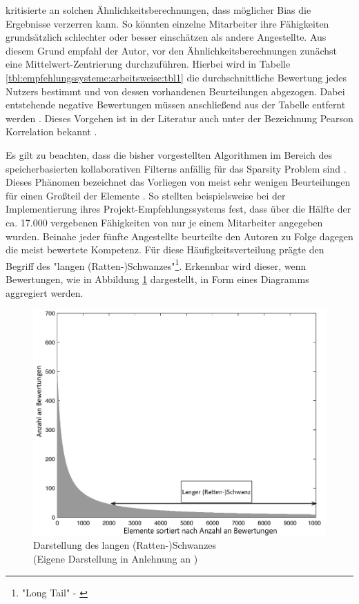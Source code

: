 \textcite[S. 34ff.]{recommenderSystems:2016} kritisierte an solchen Ähnlichkeitsberechnungen, dass möglicher Bias die Ergebnisse verzerren kann. So könnten einzelne Mitarbeiter ihre Fähigkeiten grundsätzlich schlechter oder besser einschätzen als andere Angestellte. Aus diesem Grund empfahl der Autor, vor den Ähnlichkeitsberechnungen zunächst eine Mittelwert-Zentrierung durchzuführen. Hierbei wird in Tabelle \ref{tbl:empfehlungssysteme:arbeitsweise:tbl1} die durchschnittliche Bewertung jedes Nutzers bestimmt und von dessen vorhandenen Beurteilungen abgezogen. Dabei entstehende negative Bewertungen müssen anschließend aus der Tabelle entfernt werden \cite[S. 34ff.]{recommenderSystems:2016}. Dieses Vorgehen ist in der Literatur auch unter der Bezeichnung Pearson Korrelation bekannt \cite[S. 35]{recommenderSystems:2016}\cite[S. 3]{bharti:2019}.

Es gilt zu beachten, dass die bisher vorgestellten Algorithmen im Bereich des speicherbasierten kollaborativen Filterns anfällig für das Sparsity Problem sind \cite[S. 3f.]{grvcar:2006}. Dieses Phänomen bezeichnet das Vorliegen von meist sehr wenigen Beurteilungen für einen Großteil der Elemente \cite[S. 8]{recommenderSystems:2016}. So stellten beispielsweise \textcite[S. 1ff.]{mitre:2014} bei der Implementierung ihres Projekt-Empfehlungssystems fest, dass über die Hälfte der ca. 17.000 vergebenen Fähigkeiten von nur je einem Mitarbeiter angegeben wurden. Beinahe jeder fünfte Angestellte beurteilte den Autoren zu Folge dagegen die meist bewertete Kompetenz.
Für diese Häufigkeitsverteilung prägte \textcite[S. 11, Z. 32]{anderson:2007} den Begriff des "langen (Ratten-)Schwanzes"\footnote{"Long Tail" - \textcite[S. 11, Z. 32]{anderson:2007}}. Erkennbar wird dieser, wenn Bewertungen, wie in Abbildung \ref{fig:empfehlungssysteme:cf:speicherbasiert:abb1} dargestellt, in Form eines Diagramms aggregiert werden.
\newpage
\begin{figure}[h]
	\centering
	\includegraphics[width=1\textwidth]{gfx/long-tail.png}
	\caption[Darstellung des langen (Ratten-)Schwanzes]{Darstellung des langen (Ratten-)Schwanzes\\
		(Eigene Darstellung in Anlehnung an \cite[S. 33]{recommenderSystems:2016})}
	\label{fig:empfehlungssysteme:cf:speicherbasiert:abb1}
\end{figure}

